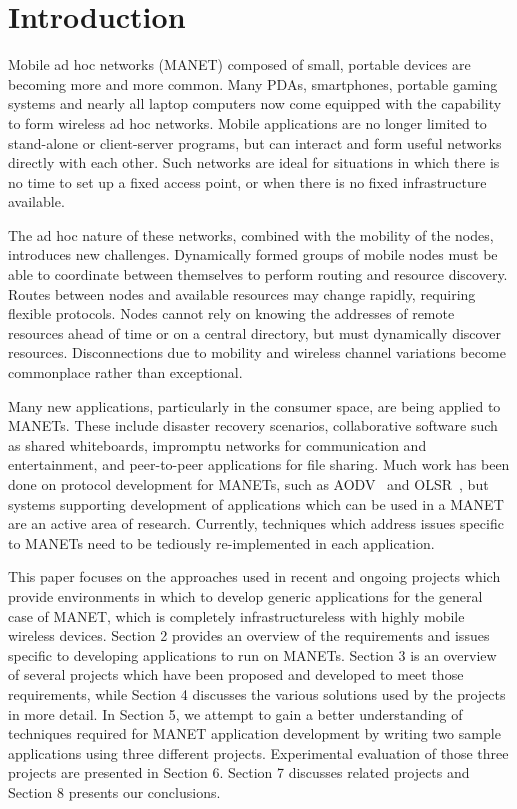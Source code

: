 \documentclass{sig-alternate}
\begin{document}
\section{Introduction}

Mobile ad hoc networks (MANET) composed of small, portable devices are becoming more and more common. Many PDAs, smartphones, portable gaming systems and nearly all laptop computers now come equipped with the capability to form wireless ad hoc networks. Mobile applications are no longer limited to stand-alone or client-server programs, but can interact and form useful networks directly with each other. Such networks are ideal for situations in which there is no time to set up a fixed access point, or when there is no fixed infrastructure available. 


The ad hoc nature of these networks, combined with the mobility of the nodes, introduces new challenges. Dynamically formed groups of mobile nodes must be able to coordinate between themselves to perform routing and resource discovery. Routes between nodes and available resources may change rapidly, requiring flexible protocols. Nodes cannot rely on knowing the addresses of remote resources ahead of time or on a central directory, but must dynamically discover resources. Disconnections due to mobility and wireless channel variations become commonplace rather than exceptional.

Many new applications, particularly in the consumer space, are being applied to MANETs. These include disaster recovery scenarios, collaborative software such as shared whiteboards, impromptu networks for communication and entertainment, and peer-to-peer applications for file sharing. Much work has been done on protocol development for MANETs, such as AODV~\cite{aodv} and OLSR~\cite{olsr}, but systems supporting development of applications which can be used in a MANET are an active area of research. Currently, techniques which address issues specific to MANETs need to be tediously re-implemented in each application.

This paper focuses on the approaches used in recent and ongoing projects which provide environments in which to develop generic applications for the general case of MANET, which is completely infrastructureless with highly mobile wireless devices. Section 2 provides an overview of the requirements and issues specific to developing applications to run on MANETs. Section 3 is an overview of several projects which have been proposed and developed to meet those requirements, while Section 4 discusses the various solutions used by the projects in more detail. In Section 5, we attempt to gain a better understanding of techniques required for MANET application development by writing two sample applications using three different projects. Experimental evaluation of those three projects are presented in Section 6. Section 7 discusses related projects and Section 8 presents our conclusions.
\end{document}
